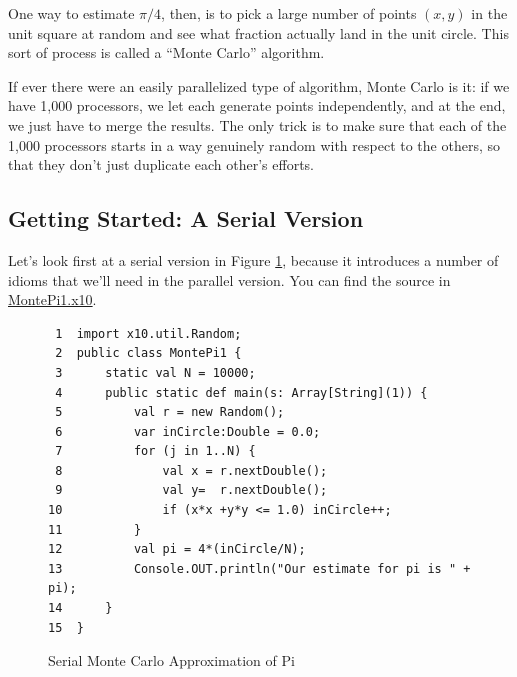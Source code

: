 One way to estimate $\pi/4$, then, is to pick a
large number of points $(x,y)$ in the unit square at random and see what fraction
actually land in the unit circle. This sort of process is called a ``Monte
Carlo'' algorithm.

If ever there 
were an easily parallelized type of algorithm, Monte Carlo is it: if we have 1,000
processors, we let each generate points independently, and at the end, we
just have to merge the results.  The only trick is to make sure that each of the 1,000
processors starts in a way genuinely random with respect to the others, so that
they don't just duplicate each other's efforts. 

\subsection{Getting Started: A Serial Version}
Let's look first at a serial version in Figure \ref{fig:mcpi}, 
because it introduces a number of \Xten{} idioms that we'll need in the
parallel version.  You can find the source in 
\href{http://dist.codehaus.org/x10/documentation/guide/src/montePi/MontePi1.x10}{MontePi1.x10}.
\begin{figure}[!htbp]
\hrulefill
\begin{verbatim}
 1  import x10.util.Random; 
 2  public class MontePi1 {
 3      static val N = 10000; 
 4      public static def main(s: Array[String](1)) { 
 5          val r = new Random();   
 6          var inCircle:Double = 0.0; 
 7          for (j in 1..N) { 
 8              val x = r.nextDouble(); 
 9              val y=  r.nextDouble(); 
10              if (x*x +y*y <= 1.0) inCircle++; 
11          }  
12          val pi = 4*(inCircle/N); 
13          Console.OUT.println("Our estimate for pi is " + pi); 
14      }
15  }
\end{verbatim}
\hrulefill
\caption{Serial Monte Carlo Approximation of Pi}\label{fig:mcpi}
\end{figure}
